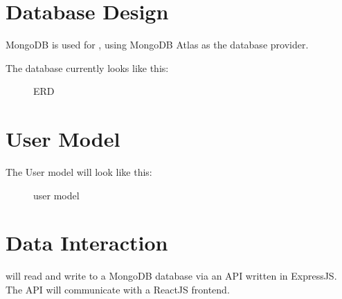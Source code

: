 \section{Database Design}
MongoDB is used for \serviceName, using MongoDB Atlas as the database provider.

The database currently looks like this:
\begin{figure}[ht]
    \centering
    \caption{\serviceName ERD}
    \label{}
\end{figure}

\section{User Model}
The User model will look like this:

\begin{figure}[ht]
    \centering
    \caption{\serviceName user model}
    \label{find use}
\end{figure}

\section{Data Interaction}
\serviceName will read and write to a MongoDB database via an API written in ExpressJS. The API will communicate
with a ReactJS frontend.